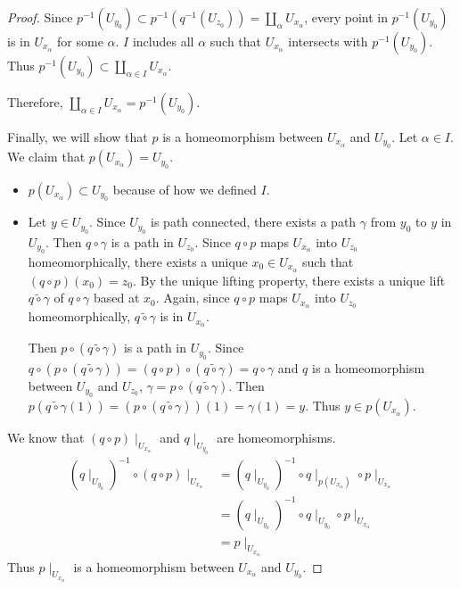 \documentclass[12pt, psamsfonts]{amsart}
\theoremstyle{definition}
\theoremstyle{remark}
\numberwithin{equation}{section}
\begin{document}
\begin{proof}
  Since $p^{-1}(U_{y_0}) \subset p^{-1}(q^{-1}(U_{z_0})) = \coprod_{\alpha} U_{x_{\alpha}}$, every point in $p^{-1}(U_{y_0})$ is in $U_{x_{\alpha}}$ for some $\alpha$.
  $I$ includes all $\alpha$ such that $U_{x_{\alpha}}$ intersects with $p^{-1}(U_{y_0})$.
  Thus $p^{-1}(U_{y_0}) \subset \coprod_{\alpha \in I} U_{x_{\alpha}}$.

  Therefore, $\coprod_{\alpha \in I} U_{x_{\alpha}} = p^{-1}(U_{y_0})$.

  Finally, we will show that $p$ is a homeomorphism between $U_{x_{\alpha}}$ and $U_{y_0}$.
  Let $\alpha \in I$.
  We claim that $p(U_{x_{\alpha}}) = U_{y_0}$.
  \begin{itemize}
    \item
      $p(U_{x_{\alpha}}) \subset U_{y_0}$ because of how we defined $I$.
    \item
      Let $y \in U_{y_0}$.
      Since $U_{y_0}$ is path connected, there exists a path $\gamma$ from $y_0$ to $y$ in $U_{y_0}$.
      Then $q \circ \gamma$ is a path in $U_{z_0}$.
      Since $q \circ p$ maps $U_{x_{\alpha}}$ into $U_{z_0}$ homeomorphically, there exists a unique $x_0 \in U_{x_{\alpha}}$ such that $(q \circ p)(x_0) = z_0$.
      By the unique lifting property, there exists a unique lift $\widetilde{q \circ \gamma}$ of $q \circ \gamma$ based at $x_0$.
      Again, since $q \circ p$ maps $U_{x_{\alpha}}$ into $U_{z_0}$ homeomorphically, $\widetilde{q \circ \gamma}$ is in $U_{x_{\alpha}}$.

      Then $p \circ (\widetilde{q \circ \gamma})$ is a path in $U_{y_0}$.
      Since $q \circ (p \circ (\widetilde{q \circ \gamma})) = (q \circ p) \circ (\widetilde{q \circ \gamma}) = q \circ \gamma$ and $q$ is a homeomorphism between $U_{y_0}$ and $U_{z_0}$, $\gamma = p \circ (\widetilde{q \circ \gamma})$.
      Then $p(\widetilde{q \circ \gamma}(1)) = (p \circ (\widetilde{q \circ \gamma}))(1) = \gamma(1) = y$.
      Thus $y \in p(U_{x_{\alpha}})$.
  \end{itemize}

  We know that $(q \circ p) \mid_{U_{x_{\alpha}}}$ and $q \mid_{U_{y_0}}$ are homeomorphisms.
  \begin{align*}
    (q \mid_{U_{y_0}})^{-1} \circ (q \circ p) \mid_{U_{x_{\alpha}}}
      &= (q \mid_{U_{y_0}})^{-1} \circ q \mid_{p(U_{x_{\alpha}})} \circ p \mid_{U_{x_{\alpha}}} \\
      &= (q \mid_{U_{y_0}})^{-1} \circ q \mid_{U_{y_0}} \circ p \mid_{U_{x_{\alpha}}} \\
      &= p \mid_{U_{x_{\alpha}}}
  \end{align*}
  Thus $p \mid_{U_{x_{\alpha}}}$ is a homeomorphism between $U_{x_{\alpha}}$ and $U_{y_0}$.


\end{proof}
\end{document}
